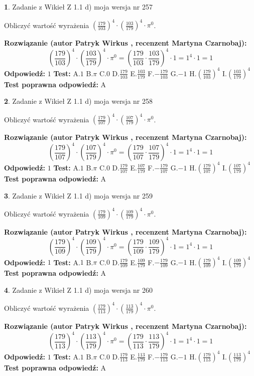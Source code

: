 \documentclass[12pt, a4paper]{article}
\theoremstyle{definition} %
\newtheorem{zad}{}
\newcommand{\zadStart}[1]{\begin{zad}#1\newline}
\newcommand{\zadStop}{\end{zad}}
\newcommand{\rozwStart}[2]{\noindent \textbf{Rozwiązanie (autor #1 , recenzent #2): }\newline}
\newcommand{\rozwStop}{\newline}
\newcommand{\odpStart}{\noindent \textbf{Odpowiedź:}\newline}
\newcommand{\odpStop}{\newline}
\newcommand{\testStart}{\noindent \textbf{Test:}\newline}
\newcommand{\testStop}{\newline}
\newcommand{\kluczStart}{\noindent \textbf{Test poprawna odpowiedź:}\newline}
\newcommand{\kluczStop}{\newline}
\begin{document}
\zadStart{Zadanie z Wikieł Z 1.1 d) moja wersja nr 257}

Obliczyć wartość wyrażenia $(\frac{179}{103})^{4} \cdot (\frac{103}{179})^{4} \cdot \pi^{0}$.
\zadStop
\rozwStart{Patryk Wirkus}{Martyna Czarnobaj}
$$(\frac{179}{103})^{4} \cdot (\frac{103}{179})^{4} \cdot \pi^{0} = (\frac{179}{103} \cdot \frac{103}{179})^{4} \cdot 1 = 1^{4} \cdot 1 = 1$$
\rozwStop
\odpStart
$1$
\odpStop
\testStart
A.$1$ B.$\pi$ C.$0$ D.$\frac{179}{103}$ E.$\frac{103}{179}$
F.$-\frac{179}{103}$ G.$-1$
H.$(\frac{179}{103})^{4}$
I.$(\frac{103}{179})^{4}$
\testStop
\kluczStart
A
\kluczStop



\zadStart{Zadanie z Wikieł Z 1.1 d) moja wersja nr 258}

Obliczyć wartość wyrażenia $(\frac{179}{107})^{4} \cdot (\frac{107}{179})^{4} \cdot \pi^{0}$.
\zadStop
\rozwStart{Patryk Wirkus}{Martyna Czarnobaj}
$$(\frac{179}{107})^{4} \cdot (\frac{107}{179})^{4} \cdot \pi^{0} = (\frac{179}{107} \cdot \frac{107}{179})^{4} \cdot 1 = 1^{4} \cdot 1 = 1$$
\rozwStop
\odpStart
$1$
\odpStop
\testStart
A.$1$ B.$\pi$ C.$0$ D.$\frac{179}{107}$ E.$\frac{107}{179}$
F.$-\frac{179}{107}$ G.$-1$
H.$(\frac{179}{107})^{4}$
I.$(\frac{107}{179})^{4}$
\testStop
\kluczStart
A
\kluczStop



\zadStart{Zadanie z Wikieł Z 1.1 d) moja wersja nr 259}

Obliczyć wartość wyrażenia $(\frac{179}{109})^{4} \cdot (\frac{109}{179})^{4} \cdot \pi^{0}$.
\zadStop
\rozwStart{Patryk Wirkus}{Martyna Czarnobaj}
$$(\frac{179}{109})^{4} \cdot (\frac{109}{179})^{4} \cdot \pi^{0} = (\frac{179}{109} \cdot \frac{109}{179})^{4} \cdot 1 = 1^{4} \cdot 1 = 1$$
\rozwStop
\odpStart
$1$
\odpStop
\testStart
A.$1$ B.$\pi$ C.$0$ D.$\frac{179}{109}$ E.$\frac{109}{179}$
F.$-\frac{179}{109}$ G.$-1$
H.$(\frac{179}{109})^{4}$
I.$(\frac{109}{179})^{4}$
\testStop
\kluczStart
A
\kluczStop



\zadStart{Zadanie z Wikieł Z 1.1 d) moja wersja nr 260}

Obliczyć wartość wyrażenia $(\frac{179}{113})^{4} \cdot (\frac{113}{179})^{4} \cdot \pi^{0}$.
\zadStop
\rozwStart{Patryk Wirkus}{Martyna Czarnobaj}
$$(\frac{179}{113})^{4} \cdot (\frac{113}{179})^{4} \cdot \pi^{0} = (\frac{179}{113} \cdot \frac{113}{179})^{4} \cdot 1 = 1^{4} \cdot 1 = 1$$
\rozwStop
\odpStart
$1$
\odpStop
\testStart
A.$1$ B.$\pi$ C.$0$ D.$\frac{179}{113}$ E.$\frac{113}{179}$
F.$-\frac{179}{113}$ G.$-1$
H.$(\frac{179}{113})^{4}$
I.$(\frac{113}{179})^{4}$
\testStop
\kluczStart
A
\kluczStop
\end{document}
